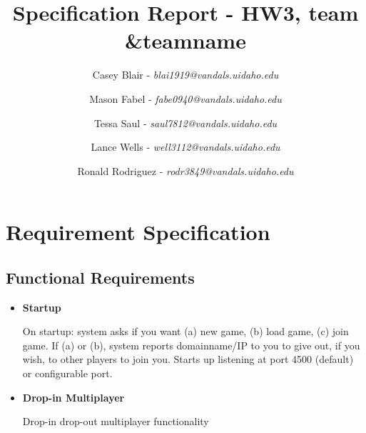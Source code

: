\documentclass[12pt]{report}
\title{Specification Report - HW3, team \&teamname}
\author{
Casey Blair - \textit{blai1919@vandals.uidaho.edu} \\
\and Mason Fabel - \textit{fabe0940@vandals.uidaho.edu} \\
\and Tessa Saul - \textit{saul7812@vandals.uidaho.edu} \\
\and Lance Wells - \textit{well3112@vandals.uidaho.edu} \\
\and Ronald Rodriguez - \textit{rodr3849@vandals.uidaho.edu} \\
}
\begin{document}
\maketitle

\chapter{Requirement Specification}
\section{Functional Requirements}
\begin{itemize}
	\item \textbf{Startup}
	
	On startup: system asks if you want (a) new game, (b) load game, (c)
	join game. If (a) or (b), system reports domainname/IP to you to give
	out, if you wish, to other players to join you. Starts up listening at
	port 4500 (default) or configurable port.
	
	\item \textbf{Drop-in Multiplayer}
	
	 Drop-in drop-out multiplayer functionality
\end{itemize}
\end{document}
